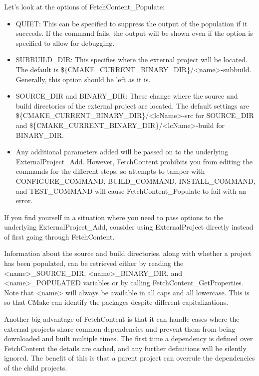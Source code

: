 Let's look at the options of FetchContent\_Populate:

\begin{itemize}
\item 
QUIET: This can be specified to suppress the output of the population if it succeeds. If the command fails, the output will be shown even if the option is specified to allow for debugging.

\item
SUBBUILD\_DIR: This specifies where the external project will be located. The default is \$\{CMAKE\_CURRENT\_BINARY\_DIR\}/<name>-subbuild. Generally, this option should be left as it is.

\item
SOURCE\_DIR and BINARY\_DIR: These change where the source and build directories of the external project are located. The default settings are \$\{CMAKE\_CURRENT\_BINARY\_DIR\}/<lcName>-src for SOURCE\_DIR and \$\{CMAKE\_CURRENT\_BINARY\_DIR\}/<lcName>-build for BINARY\_DIR.

\item
Any additional parameters added will be passed on to the underlying ExternalProject\_Add. However, FetchContent prohibits you from editing the commands for the different steps, so attempts to tamper with CONFIGURE\_COMMAND, BUILD\_COMMAND, INSTALL\_COMMAND, and TEST\_COMMAND will cause FetchContent\_Populate to fail with an error.
\end{itemize}

\begin{tcolorbox}[colback=webgreen!5!white,colframe=webgreen!75!black,title=Note]
If you find yourself in a situation where you need to pass options to the underlying ExternalProject\_Add, consider using ExternalProject directly instead of first going through FetchContent.
\end{tcolorbox}

Information about the source and build directories, along with whether a project has been populated, can be retrieved either by reading the <name>\_SOURCE\_DIR, <name>\_BINARY\_DIR, and <name>\_POPULATED variables or by calling FetchContent\_GetProperties. Note that <name> will always be available in all caps and all lowercase. This is so that CMake can identify the packages despite different capitalizations.
 
Another big advantage of FetchContent is that it can handle cases where the external projects share common dependencies and prevent them from being downloaded and built multiple times. The first time a dependency is defined over FetchContent the details are cached, and any further definitions will be silently ignored. The benefit of this is that a parent project can overrule the dependencies of the child projects.

